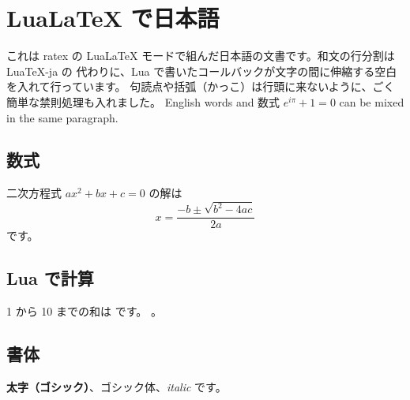 \documentclass{article}
\begin{document}
\section*{LuaLaTeX で日本語}

これは ratex の LuaLaTeX モードで組んだ日本語の文書です。和文の行分割は LuaTeX-ja の
代わりに、Lua で書いたコールバックが文字の間に伸縮する空白を入れて行っています。
句読点や括弧（かっこ）は行頭に来ないように、ごく簡単な禁則処理も入れました。
English words and 数式 $e^{i\pi}+1=0$ can be mixed in the same paragraph.

\subsection*{数式}
二次方程式 $ax^2+bx+c=0$ の解は
\begin{equation}
  x = \frac{-b \pm \sqrt{b^2-4ac}}{2a}
\end{equation}
です。

\subsection*{Lua で計算}
1 から 10 までの和は  です。
。

\subsection*{書体}
\textbf{太字（ゴシック）}、\textsf{ゴシック体}、\textit{italic} です。
\end{document}
